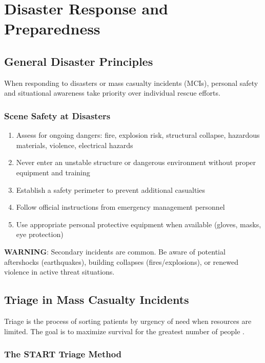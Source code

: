 \chapter{Disaster Response and Preparedness}\label{ch:disaster}

\section{General Disaster Principles}

When responding to disasters or mass casualty incidents (MCIs), personal safety and situational awareness take priority over individual rescue efforts.

\subsection{Scene Safety at Disasters}

\begin{enumerate}
  \item Assess for ongoing dangers: fire, explosion risk, structural collapse, hazardous materials, violence, electrical hazards
  \item Never enter an unstable structure or dangerous environment without proper equipment and training
  \item Establish a safety perimeter to prevent additional casualties
  \item Follow official instructions from emergency management personnel
  \item Use appropriate personal protective equipment when available (gloves, masks, eye protection)
\end{enumerate}

\noindent\textbf{WARNING}: Secondary incidents are common. Be aware of potential aftershocks (earthquakes), building collapses (fires/explosions), or renewed violence in active threat situations.

\section{Triage in Mass Casualty Incidents}

Triage is the process of sorting patients by urgency of need when resources are limited. The goal is to maximize survival for the greatest number of people \cite{who_mtbs}.

\subsection{The START Triage Method}

